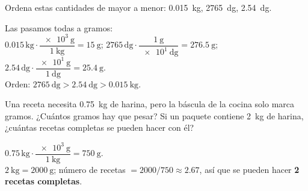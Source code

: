 \begin{exercise}
    Ordena estas cantidades de mayor a menor: \qty{0.015}{\kg}, \qty{2765}{\deci\gram}, \qty{2.54}{\deca\gram}.
    \begin{solu}
        Las pasamos todas a gramos: \\
        \(\num{0.015}\,\unit{\kg} \cdot \dfrac{\qty{e3}{\g}}{\qty{1}{\kg}} = \qty{15}{\g}\); \quad
        \(\num{2765}\,\unit{\deci\gram} \cdot \dfrac{\qty{1}{\g}}{\qty{e1}{\deci\gram}} = \qty{276.5}{\g}\); \quad
        \(\num{2.54}\,\unit{\deca\gram} \cdot \dfrac{\qty{e1}{\g}}{\qty{1}{\deca\gram}} = \qty{25.4}{\g}\). \\
        Orden: \(\qty{2765}{\deci\gram} > \qty{2.54}{\deca\gram} > \qty{0.015}{\kg}\).
    \end{solu}
\end{exercise}

\begin{exercise}
    Una receta necesita \qty{0.75}{\kg} de harina, pero la báscula de la cocina solo marca gramos. ¿Cuántos gramos hay que pesar? Si un paquete contiene \qty{2}{\kg} de harina, ¿cuántas recetas completas se pueden hacer con él?
    \begin{solu}
        \(\num{0.75}\,\unit{\kg} \cdot \dfrac{\qty{e3}{\g}}{\qty{1}{\kg}} = \qty{750}{\g}\). \\
        \(\qty{2}{\kg} = \qty{2000}{\g}\); número de recetas \(= 2000 / 750 \approx \num{2.67}\), así que se pueden hacer \textbf{2 recetas completas}.
    \end{solu}
\end{exercise}

